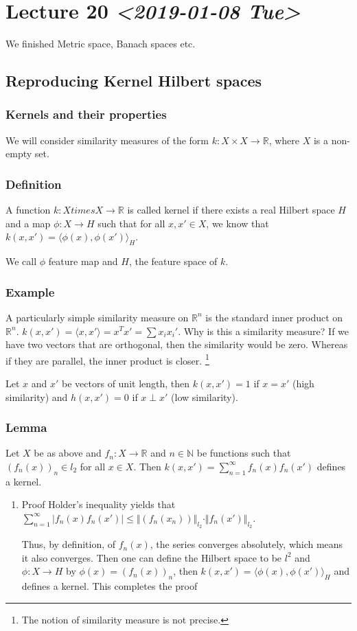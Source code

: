 \documentclass[11pt]{article}
\def\R{\mathbb{R}}
\def\N{\mathbb{N}}
\begin{document}
\section{Lecture 20 \textit{<2019-01-08 Tue>}}
\label{sec:org07afdfa}
We finished Metric space, Banach spaces etc.
\subsection{Reproducing Kernel Hilbert spaces}
\label{sec:orge2f3f90}
\subsubsection{Kernels and their properties}
\label{sec:org0e1f585}
We will consider similarity measures of the form \(k \colon X \times X
    \rightarrow \R\), where \(X\) is a non-empty set.
\subsubsection{Definition}
\label{sec:org5d3121d}
A function \(k \colon X times X \rightarrow \R\) is called kernel if there
exists a real Hilbert space \(H\) and a map \(\phi \colon X \rightarrow H\) such
that for all \(x, x' \in X\), we know that \(k(x, x') = \langle \phi(x),
    \phi(x') \rangle_H\).

We call \(\phi\) feature map and \(H\), the feature space of \(k\).
\subsubsection{Example}
\label{sec:orgf7453eb}
A particularly simple similarity measure on \(\R^n\) is the standard inner
product on \(\R^n\). \(k(x, x') = \langle x, x'\rangle = x^T x' = \sum x_i
    x_i'\). Why is this a similarity measure? If we have two vectors that are
orthogonal, then the similarity would be zero. Whereas if they are parallel,
the inner product is closer. \footnote{The notion of similarity measure is not precise.}

Let \(x\) and \(x'\) be vectors of unit length, then \(k(x, x') = 1\) if \(x = x'\)
(high similarity) and \(h(x, x') = 0\) if \(x \perp x'\) (low similarity).
\subsubsection{Lemma}
\label{sec:org364e245}
Let \(X\) be as above and \(f_n \colon X \rightarrow \R\) and \(n \in \N\) be
functions such that \((f_n(x))_n\in l_2\) for all \(x\in X\). Then \(k(x, x') =
    \sum_{n = 1}^{\infty} f_n(x) f_n(x')\) defines a kernel.
\begin{enumerate}
\item Proof
\label{sec:orgaa3503f}
Holder's inequality yields that \(\sum_{n=1}^{\infty} \vert f_n(x)
     f_n(x')\vert \le \Vert (f_n(x_n)) \Vert_{l_2} \cdot \Vert f_n(x')
     \Vert_{l_2}\). 

Thus, by definition, of \(f_n(x)\), the series converges absolutely, which
means it also converges. Then one can define the Hilbert space to be \(l^2\)
and \(\phi \colon X\rightarrow H\) by \(\phi(x) = (f_n(x))_n\), then \(k(x, x') =
     \langle \phi(x), \phi(x')\rangle_H\) and defines a kernel. This completes
the proof
\end{enumerate}
\end{document}
